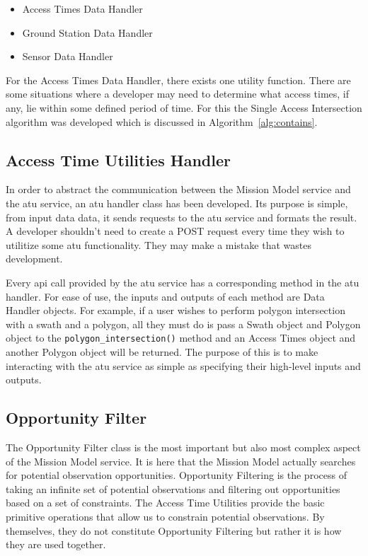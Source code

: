 \begin{itemize} 
    
    \item Access Times Data Handler
    \item Ground Station Data Handler
    \item Sensor Data Handler

\end{itemize}

For the Access Times Data Handler, there exists one utility function. There are
some situations where a developer may need to determine what access times, if
any, lie within some defined period of time. For this the Single Access
Intersection algorithm was developed which is discussed in
Algorithm~\ref{alg:contains}.


\subsection{Access Time Utilities Handler}

In order to abstract the communication between the Mission Model service and
the \gls{atu} service, an \gls{atu} handler class has been developed. Its
purpose is simple, from input data data, it sends requests to the \gls{atu}
service and formats the result. A developer shouldn't need to create a POST
request every time they wish to utilitize some \gls{atu} functionality. They
may make a mistake that wastes development. 

Every \gls{api} call provided by the \gls{atu} service has a corresponding
method in the \gls{atu} handler. For ease of use, the inputs and outputs of
each method are Data Handler objects. For example, if a user wishes to perform
polygon intersection with a swath and a polygon, all they must do is pass a
Swath object and Polygon object to the \texttt{polygon\_intersection()} method
and an Access Times object and another Polygon object will be returned. The
purpose of this is to make interacting with the \gls{atu} service as simple as
specifying their high-level inputs and outputs.


\subsection{Opportunity Filter}

The Opportunity Filter class is the most important but also most complex aspect
of the Mission Model service. It is here that the Mission Model actually
searches for potential observation opportunities. Opportunity Filtering is the
process of taking an infinite set of potential observations and filtering out
opportunities based on a set of constraints. The Access Time Utilities provide
the basic primitive operations that allow us to constrain potential
observations. By themselves, they do not constitute Opportunity Filtering but
rather it is how they are used together.

